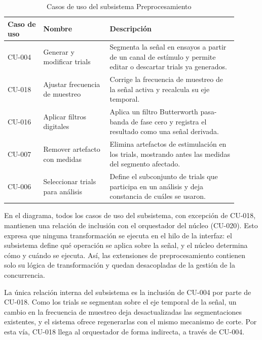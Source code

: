 \documentclass[11pt,a4paper]{article}
\DeclareRobustCommand{\_}{\textunderscore\allowbreak}
\begin{document}
\begin{table}[H]
    \centering
    \caption{Casos de uso del subsistema Preprocesamiento}
    \label{tab:cu_preproc}
    \begin{tabular}{|p{0.14\linewidth}|p{0.26\linewidth}|p{0.50\linewidth}|}
        \hline
        \textbf{Caso de uso} & \textbf{Nombre} & \textbf{Descripci\'on} \\
        \hline
        CU-004 & Generar y modificar trials & Segmenta la se\~nal en ensayos a partir de un canal de est\'imulo y permite editar o descartar trials ya generados. \\
        \hline
        CU-018 & Ajustar frecuencia de muestreo & Corrige la frecuencia de muestreo de la se\~nal activa y recalcula su eje temporal. \\
        \hline
        CU-016 & Aplicar filtros digitales & Aplica un filtro Butterworth pasa-banda de fase cero y registra el resultado como una se\~nal derivada. \\
        \hline
        CU-007 & Remover artefacto con medidas & Elimina artefactos de estimulaci\'on en los trials, mostrando antes las medidas del segmento afectado. \\
        \hline
        CU-006 & Seleccionar trials para an\'alisis & Define el subconjunto de trials que participa en un an\'alisis y deja constancia de cu\'ales se usaron. \\
        \hline
    \end{tabular}
\end{table}

En el diagrama, todos los casos de uso del subsistema, con excepci\'on de CU-018, mantienen una relaci\'on de inclusi\'on con el orquestador del n\'ucleo (CU-020). Esto expresa que ninguna transformaci\'on se ejecuta en el hilo de la interfaz: el subsistema define qu\'e operaci\'on se aplica sobre la se\~nal, y el n\'ucleo determina c\'omo y cu\'ando se ejecuta. As\'i, las extensiones de preprocesamiento contienen solo su l\'ogica de transformaci\'on y quedan desacopladas de la gesti\'on de la concurrencia.

La \'unica relaci\'on interna del subsistema es la inclusi\'on de CU-004 por parte de CU-018. Como los trials se segmentan sobre el eje temporal de la se\~nal, un cambio en la frecuencia de muestreo deja desactualizadas las segmentaciones existentes, y el sistema ofrece regenerarlas con el mismo mecanismo de corte. Por esta v\'ia, CU-018 llega al orquestador de forma indirecta, a trav\'es de CU-004.
\end{document}
